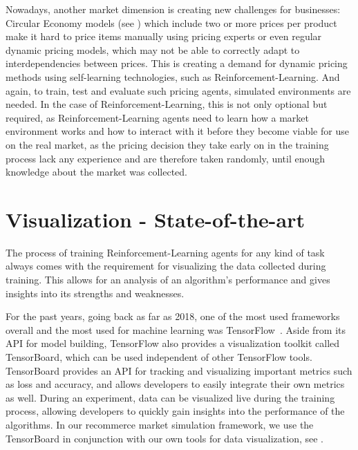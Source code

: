 Nowadays, another market dimension is creating new challenges for businesses: Circular Economy models (see ) which include two or more prices per product make it hard to price items manually using pricing experts or even regular dynamic pricing models, which may not be able to correctly adapt to interdependencies between prices. This is creating a demand for dynamic pricing methods using self-learning technologies, such as Reinforcement-Learning. And again, to train, test and evaluate such pricing agents, simulated environments are needed. In the case of Reinforcement-Learning, this is not only optional but required, as Reinforcement-Learning agents need to learn how a market environment works and how to interact with it before they become viable for use on the real market, as the pricing decision they take early on in the training process lack any experience and are therefore taken randomly, until enough knowledge about the market was collected.

\section*{Visualization - State-of-the-art}

The process of training Reinforcement-Learning agents for any kind of task always comes with the requirement for visualizing the data collected during training. This allows for an analysis of an algorithm's performance and gives insights into its strengths and weaknesses.

For the past years, going back as far as 2018, one of the most used frameworks overall and the most used for machine learning was TensorFlow~\cite{StackOverflowSurvey}. Aside from its API for model building, TensorFlow also provides a visualization toolkit called TensorBoard, which can be used independent of other TensorFlow tools. TensorBoard provides an API for tracking and visualizing important metrics such as loss and accuracy, and allows developers to easily integrate their own metrics as well. During an experiment, data can be visualized live during the training process, allowing developers to quickly gain insights into the performance of the algorithms. In our recommerce market simulation framework, we use the TensorBoard in conjunction with our own tools for data visualization, see .

